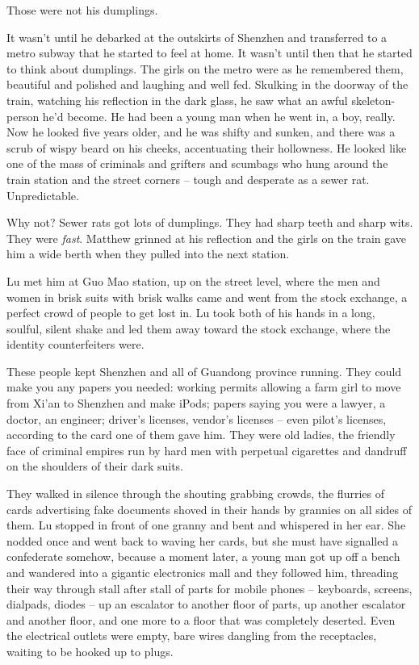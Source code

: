 Those were not his dumplings.

It wasn't until he debarked at the outskirts of Shenzhen and
transferred to a metro subway that he started to feel at home. It
wasn't until then that he started to think about dumplings. The
girls on the metro were as he remembered them, beautiful and
polished and laughing and well fed. Skulking in the doorway of the
train, watching his reflection in the dark glass, he saw what an
awful skeleton-person he'd become. He had been a young man when he
went in, a boy, really. Now he looked five years older, and he was
shifty and sunken, and there was a scrub of wispy beard on his
cheeks, accentuating their hollowness. He looked like one of the
mass of criminals and grifters and scumbags who hung around the
train station and the street corners -- tough and desperate as a
sewer rat. Unpredictable.

Why not? Sewer rats got lots of dumplings. They had sharp teeth and
sharp wits. They were \emph{fast}. Matthew grinned at his
reflection and the girls on the train gave him a wide berth when
they pulled into the next station.

Lu met him at Guo Mao station, up on the street level, where the
men and women in brisk suits with brisk walks came and went from
the stock exchange, a perfect crowd of people to get lost in. Lu
took both of his hands in a long, soulful, silent shake and led
them away toward the stock exchange, where the identity
counterfeiters were.

These people kept Shenzhen and all of Guandong province running.
They could make you any papers you needed: working permits allowing
a farm girl to move from Xi'an to Shenzhen and make iPods; papers
saying you were a lawyer, a doctor, an engineer; driver's licenses,
vendor's licenses -- even pilot's licenses, according to the card
one of them gave him. They were old ladies, the friendly face of
criminal empires run by hard men with perpetual cigarettes and
dandruff on the shoulders of their dark suits.

They walked in silence through the shouting grabbing crowds, the
flurries of cards advertising fake documents shoved in their hands
by grannies on all sides of them. Lu stopped in front of one granny
and bent and whispered in her ear. She nodded once and went back to
waving her cards, but she must have signalled a confederate
somehow, because a moment later, a young man got up off a bench and
wandered into a gigantic electronics mall and they followed him,
threading their way through stall after stall of parts for mobile
phones -- keyboards, screens, dialpads, diodes -- up an escalator
to another floor of parts, up another escalator and another floor,
and one more to a floor that was completely deserted. Even the
electrical outlets were empty, bare wires dangling from the
receptacles, waiting to be hooked up to plugs.


